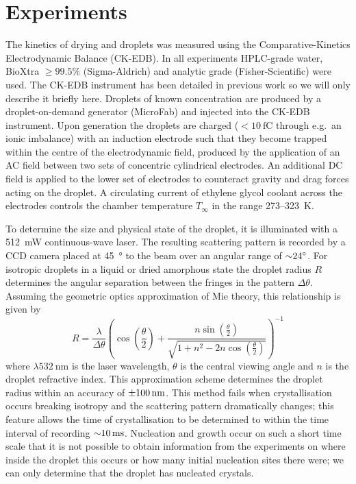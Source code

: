 \documentclass[11pt,twoside]{report}
\begin{document}
\section{Experiments}
\label{sec:experiments}

The kinetics of drying  and  droplets was measured using the Comparative-Kinetics Electrodynamic Balance (CK-EDB).
In all experiments HPLC-grade water, BioXtra $\ge 99.5\%$  (Sigma-Aldrich) and analytic grade  (Fisher-Scientific) were used.
The CK-EDB instrument has been detailed in previous work \cite{DaviesAST2012} so we will only describe it briefly here.
Droplets of known concentration are produced by a droplet-on-demand generator (MicroFab) and injected into the CK-EDB instrument.
Upon generation the droplets are charged ($<\SI{10}{\femto\coulomb}$ through e.g.\ an ionic imbalance) with an induction electrode such that they become trapped within the centre of the electrodynamic field, produced by the application of an AC field between two sets of concentric cylindrical electrodes.
An additional DC field is applied to the lower set of electrodes to counteract gravity and drag forces acting on the droplet.
A circulating current of ethylene glycol coolant across the electrodes controls the chamber temperature $T_{\infty}$ in the range 273--\SI{323}{\kelvin}.

To determine the size and physical state of the droplet, it is illuminated with a \SI{512}{\milli\watt} continuous-wave laser.
The resulting scattering pattern is recorded by a CCD camera placed at \SI{45}{\degree} to the beam over an angular range of $\SI{\sim24}{\degree}$.
For isotropic droplets in a liquid or dried amorphous state the droplet radius $R$ determines the angular separation between the fringes in the pattern $\Delta \theta$.
Assuming the geometric optics approximation of Mie theory, this relationship is given by
\begin{equation*}
  R
  =
  \frac{\lambda}{\Delta \theta} \left(
  \cos{\left(\frac{\theta}{2}\right)}
  + \frac{n \sin{\left(\frac{\theta}{2}\right)}}{\sqrt{1 + n^2 - 2n \cos{\left(\frac{\theta}{2}\right)}}}
  \right)^{-1}
\end{equation*}
where $\lambda \SI{532}{\nano\metre}$ is the laser wavelength, $\theta$ is the central viewing angle and $n$ is the droplet refractive index.
This approximation scheme determines the droplet radius within an accuracy of $\SI{\pm100}{\nano\metre}$.
This method fails when crystallisation occurs breaking isotropy and the scattering pattern dramatically changes; this feature allows the time of crystallisation to be determined to within the time interval of recording $\SI{\sim10}{\milli\second}$.
Nucleation and growth occur on such a short time scale that it is not possible to obtain information from the experiments on where inside the droplet this occurs or how many initial nucleation sites there were; we can only determine that the droplet has nucleated crystals.
\end{document}
